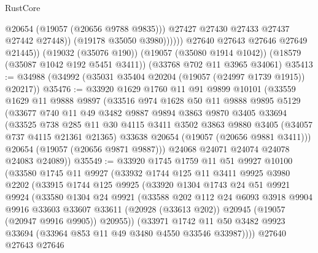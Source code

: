 \begin{lexlean}{RustCore}
\begin{coremodule}
                        @20654
                        (@19057 (@20656 @9788 @9835)))
                      @27427
                      @27430
                      @27433
                      @27437
                      @27442
                      @27448))
                  (@19178 @35050 @3980))))))
        @27640
        @27643
        @27646
        @27649
        @21445))
    (@19032 (@35076 @190))
    (@19057 (@35080 @1914 @1042))
    (@18579 (@35087 @1042 @192 @5451 @3411))
    (@33768 @702 @11 @3965 @34061)
@35413 := @34988 (@34992 (@35031 @35404 @20204 (@19057 (@24997 @1739 @1915)) @20217))
@35476 := @33920
    @1629
    @1760
    @11
    @91
    @9899
    @10101
    (@33559
      @1629
      @11
      @9888
      @9897
      (@33516
        @974
        @1628
        @50
        @11
        @9888
        @9895
        @5129
        (@33677
          @740
          @11
          @49
          @3482
          @9887
          @9894
          @3863
          @9870
          @3405
          @33694
          (@33525
            @738
            @285
            @11
            @30
            @4115
            @3411
            @3502
            @3863
            @9880
            @3405
            (@34057 @737 @4115 @21361 @21365)
            @33638
            @20654
            (@19057 (@20656 @9881 @3411)))
          @20654
          (@19057 (@20656 @9871 @9887)))
        @24068
        @24071
        @24074
        @24078
        @24083
        @24089))
@35549 := @33920
    @1745
    @1759
    @11
    @51
    @9927
    @10100
    (@33580
      @1745
      @11
      @9927
      (@33932
        @1744
        @125
        @11
        @3411
        @9925
        @3980
        @2202
        (@33915
          @1744
          @125
          @9925
          (@33920
            @1304
            @1743
            @24
            @51
            @9921
            @9924
            (@33580
              @1304
              @24
              @9921
              (@33588
                @202
                @112
                @24
                @6093
                @3918
                @9904
                @9916
                @33603
                @33607
                @33611
                (@20928 (@33613 @202))
                @20945
                (@19057 (@20947 @9916 @9905))
                @20955))
            (@33971
              @1742
              @11
              @50
              @3482
              @9923
              @33694
              (@33964 @853 @11 @49 @3480 @4550 @33546 @33987))))
        @27640
        @27643
        @27646

\end{coremodule}
\end{lexlean}
